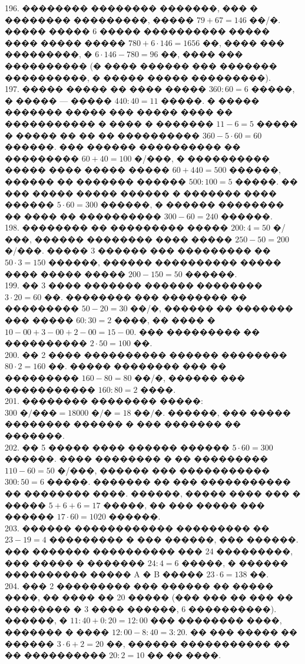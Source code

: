 \documentclass[12pt]{article}
\begin{document}
196. �������� �������� �������, ��� � �������� ���������, ����� $79+67=146$ ��/�. ����� ����� 6 ����� ���������� ����� ���� ����� ����� $780+6\cdot146=1656$ ��, ���� ��� ���������, � $6\cdot146-780=96$ ��, ���� ��� ���������� (� ���� ������ ��� ������� ����������, � ����� ����� ���������).\\
197. ����� ����� �� ���� ����� $360:60=6$ �����, � ����� --- ����� $440:40=11$ �����. � ����� ������� ����� ��� ����� ���� �� ����������� � ���� � ������� $11-6=5$ ����� � ����� �� �� �� ���������� $360-5\cdot60=60$ ������. ��� ������ ���������� �� ��������� $60+40=100$ �/���, � ���������� ����� ���� ����� ����� $60+440=500$ ������, ������ �� ������� ������ $500:100=5$ �����. �� ��� ����� ����� ������ � ������� ���� ������ $5\cdot60=300$ ������, � ������ �������� �� ���� �� ���������� $300-60=240$ ������.\\
198. �������� �� ��������� ����� $200:4=50$ �/���, ������ �������� ���� ����� $250-50=200$ �/���. ����� 3 ������ ��� ��������� �� $50\cdot3=150$ ������, ������ ���������� ����� ���� ����� ����� $200-150=50$ ������.\\
199. �� 3 ���� ������� ������ �������� $3\cdot20=60$ ��. �������� ��� �������� �� ��������� $50-20=30$ ��/�, ������ �� ������� ��� ����� $60:30=2$ ����, �� ���� � $10-00+3-00+2-00=15-00.$ ��� ��������� �� ���������� $2\cdot50=100$ ��.\\
200. �� 2 ���� ���������� ������ �������� $80\cdot2=160$ ��. ����� �������� ��� �� ��������� $160-80=80$ ��/�, ������ ��� ����������� $160:80=2$ ����.\\
201. �������� �������� �����: $300\text{ �/���}=18000\text{ �/�}=18\text{ ��/�.}$ ������, ��� ����� �������� ������ � ��� ������� �� �������.\\
202. �� 5 ����� ���� ������ ������ $5\cdot60=300$ ������. ���� �������� � �� ��������� $110-60=50$ �/���, ������ ��� ����������� $300:50=6$ �����. ������� �� ��� ����������� �� �������� ����. ������, ����� ���� ��� � ����� $5+6+6=17$ �����, �� ��� ����� ��� ������ $17\cdot60=1020$ ������.\\
203. ������ ������������ ��������� �� $23-19=4$ ��������� � ��� ������, ��� ������. ��� ������� ���������� ��� 24 ���������, ��� ����� � ������� $24:4=6$ �����, � ������ ���������� ����� A � B ����� $23\cdot6=138$ ��.\\
204. ��� 2 ��������� ��� ������ �� ����� ����, �� ���� �� 20 ����� (��� ��� �� ��� �� �������� � 3 ���� ������, 6 ����������). ������, � $11:40+0:20=12:00$ ��� �������� ����, ������� � ���� $12:00-8:40=3:20.$ �� ��� ����� �� ������ $3\cdot6+2=20$ ��, ������ ����������� �� �� ���������� $20:2=10$ �� �� ����.\\
\end{document}
